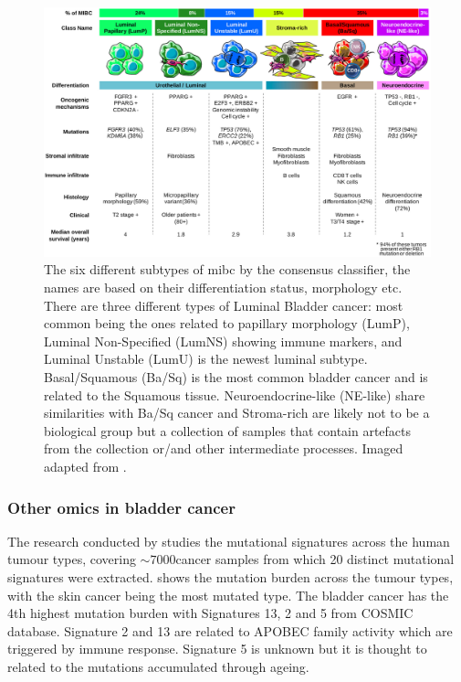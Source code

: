 \begin{figure}[!htb]   
\centering
\includegraphics[width=1.0\textwidth,height=1.0\textheight,keepaspectratio]{Sections/Lit_review/Resources/2020_consensus_subtypes.jpg}
  \caption{The six different subtypes of \acrfull{mibc} by the consensus classifier\cite{Kamoun2020-tj}, the names are based on their differentiation status, morphology etc. There are three different types of Luminal Bladder cancer: most common being the ones related to papillary morphology (LumP), Luminal Non-Specified (LumNS) showing immune markers, and Luminal Unstable (LumU) is the newest luminal subtype. Basal/Squamous (Ba/Sq) is the most common bladder cancer and is related to the Squamous tissue. Neuroendocrine-like (NE-like) share similarities with Ba/Sq cancer and Stroma-rich are likely not to be a biological group but a collection of samples that contain artefacts from the collection or/and other intermediate processes. Imaged adapted from \cite{Kamoun2020-tj}.
}
\label{fig:2020_consens}
\end{figure}
\FloatBarrier


\subsubsection{Other omics in bladder cancer}

The research conducted by \citet{Alexandrov2013-gi} studies the mutational signatures across the human tumour types, covering $\sim7000 $cancer samples from which 20 distinct mutational signatures were extracted.  shows the mutation burden across the tumour types, with the skin cancer being the most mutated type. The bladder cancer has the 4th highest mutation burden with Signatures 13, 2 and 5 from COSMIC database\cite{Tate2019-yj}. Signature 2 and 13 are related to APOBEC family activity which are triggered by immune response. Signature 5 is unknown but it is thought to related to the mutations accumulated through ageing. 

